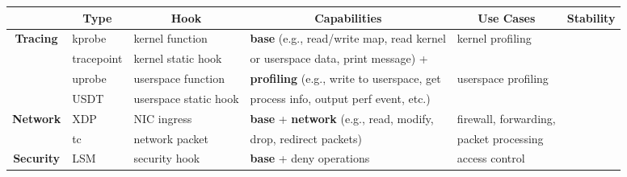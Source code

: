 \begin{table*}[t]
  \newcommand*{\thead}[1]{\multicolumn{1}{|c}{\bfseries #1}}
  \newcommand{\stari}{\raisebox{-0.25em}{\FiveStar\FiveStarOpen\FiveStarOpen\FiveStarOpen\FiveStarOpen}}
  \newcommand{\starii}{\raisebox{-0.25em}{\FiveStar\FiveStar\FiveStarOpen\FiveStarOpen\FiveStarOpen}}
  \newcommand{\stariii}{\raisebox{-0.25em}{\FiveStar\FiveStar\FiveStar\FiveStarOpen\FiveStarOpen}}
  \newcommand{\stariv}{\raisebox{-0.25em}{\FiveStar\FiveStar\FiveStar\FiveStar\FiveStarOpen}}

  \setlength{\tabcolsep}{4.5pt}

  \centering
  \begin{tabular}{c||l|l|l|l|l}
     & \thead{Type}   & \thead{Hook}          & \thead{Capabilities}                                  & \thead{Use Cases}                    & \thead{Stability} \\ \hline \hline

    \multirow{4}{*}{\textbf{Tracing}}
     & kprobe         & kernel function       & \textbf{base} (e.g., read/write map, read kernel      & \multirow{2}{*}{kernel profiling}    & \stari            \\ \cline{2-3} \cline{6-6}
     & tracepoint     & kernel static hook    & \quad  or userspace data, print message) +            &                                      & \starii           \\ \cline{2-3} \cline{5-6}
     & uprobe         & userspace function    & \textbf{profiling} (e.g., write to userspace, get     & \multirow{2}{*}{userspace profiling} & \stari            \\ \cline{2-3} \cline{6-6}
     & USDT           & userspace static hook & \quad process info, output perf event, etc.)          &                                      & \starii           \\ \hline


    \multirow{2}{*}{\textbf{Network}}
     & XDP            & NIC ingress           & \textbf{base} + \textbf{network} (e.g., read, modify, & firewall, forwarding,                & \stariv           \\ \cline{2-3} \cline{6-6}
     & tc             & network packet        & drop, redirect packets)                               & packet processing                    & \stariv           \\ \hline

    \multirow{1}{*}{\textbf{Security}}
     & LSM            & security hook         & \textbf{base} + deny operations                       & access control                       & \stariii          \\ \hline


\end{tabular}
\end{table*}
